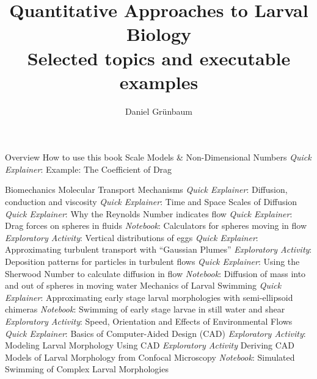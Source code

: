 \documentclass[10pt,a4paper]{article}
\begin{document}
\def\QE{\textit{Quick Explainer}\xspace}
\def\NB{\textit{Notebook}\xspace}
\def\EA{\textit{Exploratory Activity}\xspace}
\def\MD{\textit{Modeling Description}\xspace}
	
\title{Quantitative Approaches to Larval Biology \\ {\Large Selected topics and executable examples}}
	
\author{Daniel Gr\"unbaum}
\maketitle
	
\begin{outline}[enumerate]
\1 Overview 
	\2 How to use this book
	\2 Scale Models \& Non-Dimensional Numbers
		\3 \QE: Example: The Coefficient of Drag
		
\1 Biomechanics
	\2 Molecular Transport Mechanisms
		\3 \QE: Diffusion, conduction and viscosity
		\3 \QE: Time and Space Scales of Diffusion
		\3 \QE: Why the Reynolds Number indicates flow
		\3 \QE: Drag forces on spheres in fluids
		\3 \NB: Calculators for spheres moving in flow
		\3 \EA: Vertical distributions of eggs 
		\3 \QE: Approximating turbulent transport with ``Gaussian Plumes''
		\3 \EA: Deposition patterns for particles in turbulent flows
		\3 \QE: Using the Sherwood Number to calculate diffusion in flow
		\3 \NB: Diffusion of mass into and out of spheres in moving water
	\2 Mechanics of Larval Swimming
		\3 \QE: Approximating early stage larval morphologies with semi-ellipsoid chimeras
		\3 \NB: Swimming of early stage larvae in still water and shear 
		\3 \EA: Speed, Orientation and Effects of Environmental Flows
		\3 \QE: Basics of Computer-Aided Design (CAD)
		\3 \EA: Modeling Larval Morphology Using CAD
		\3 \EA  Deriving CAD Models of Larval Morphology from Confocal Microscopy
		\3 \NB: Simulated Swimming of Complex Larval Morphologies
		

\end{outline}
\end{document}
